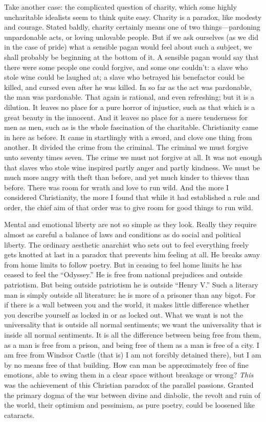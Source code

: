 \documentclass{book}
\begin{document}
Take another case: the complicated question of charity, which some highly uncharitable idealists seem to think quite easy. Charity is a paradox, like modesty and courage. Stated baldly, charity certainly means one of two things—pardoning unpardonable acts, or loving unlovable people. But if we ask ourselves (as we did in the case of pride) what a sensible pagan would feel about such a subject, we shall probably be beginning at the bottom of it. A sensible pagan would say that there were some people one could forgive, and some one couldn’t: a slave who stole wine could be laughed at; a slave who betrayed his benefactor could be killed, and cursed even after he was killed. In so far as the act was pardonable, the man was pardonable. That again is rational, and even refreshing; but it is a dilution. It leaves no place for a pure horror of injustice, such as that which is a great beauty in the innocent. And it leaves no place for a mere tenderness for men as men, such as is the whole fascination of the charitable. Christianity came in here as before. It came in startlingly with a sword, and clove one thing from another. It divided the crime from the criminal. The criminal we must forgive unto seventy times seven. The crime we must not forgive at all. It was not enough that slaves who stole wine inspired partly anger and partly kindness. We must be much more angry with theft than before, and yet much kinder to thieves than before. There was room for wrath and love to run wild. And the more I considered Christianity, the more I found that while it had established a rule and order, the chief aim of that order was to give room for good things to run wild.

Mental and emotional liberty are not so simple as they look. Really they require almost as careful a balance of laws and conditions as do social and political liberty. The ordinary aesthetic anarchist who sets out to feel everything freely gets knotted at last in a paradox that prevents him feeling at all. He breaks away from home limits to follow poetry. But in ceasing to feel home limits he has ceased to feel the “Odyssey.” He is free from national prejudices and outside patriotism. But being outside patriotism he is outside “Henry V.” Such a literary man is simply outside all literature: he is more of a prisoner than any bigot. For if there is a wall between you and the world, it makes little difference whether you describe yourself as locked in or as locked out. What we want is not the universality that is outside all normal sentiments; we want the universality that is inside all normal sentiments. It is all the difference between being free from them, as a man is free from a prison, and being free of them as a man is free of a city. I am free from Windsor Castle (that is) I am not forcibly detained there), but I am by no means free of that building. How can man be approximately free of fine emotions, able to swing them in a clear space without breakage or wrong? \emph{This} was the achievement of this Christian paradox of the parallel passions. Granted the primary dogma of the war between divine and diabolic, the revolt and ruin of the world, their optimism and pessimism, as pure poetry, could be loosened like cataracts.
\end{document}
